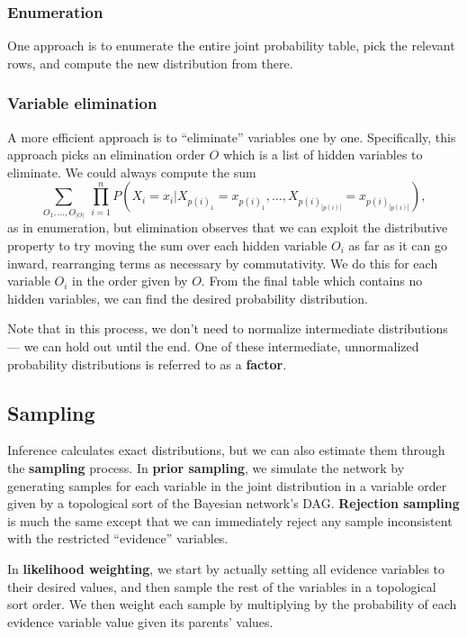 \documentclass[12pt]{article}
\begin{document}
\subsubsection{Enumeration}

One approach is to enumerate the entire joint probability table, pick the relevant rows, and compute the new distribution from there.

\subsubsection{Variable elimination}

A more efficient approach is to ``eliminate'' variables one by one. Specifically, this approach picks an elimination order $O$ which is a list of hidden variables to eliminate. We could always compute the sum
\[ \sum_{O_1, \ldots, O_{|O|}}\ \prod_{i = 1}^n P(X_i = x_i | X_{p(i)_1} = x_{p(i)_1}, \ldots, X_{p(i)_{|p(i)|}} = x_{p(i)_{|p(i)|}}), \]
as in enumeration, but elimination observes that we can exploit the distributive property to try moving the sum over each hidden variable $O_i$ as far as it can go inward, rearranging terms as necessary by commutativity. We do this for each variable $O_i$ in the order given by $O$. From the final table which contains no hidden variables, we can find the desired probability distribution.

Note that in this process, we don't need to normalize intermediate distributions --- we can hold out until the end. One of these intermediate, unnormalized probability distributions is referred to as a \textbf{factor}.

\subsection{Sampling}

Inference calculates exact distributions, but we can also estimate them through the \textbf{sampling} process. In \textbf{prior sampling}, we simulate the network by generating samples for each variable in the joint distribution in a variable order given by a topological sort of the Bayesian network's DAG. \textbf{Rejection sampling} is much the same except that we can immediately reject any sample inconsistent with the restricted ``evidence'' variables.

In \textbf{likelihood weighting}, we start by actually setting all evidence variables to their desired values, and then sample the rest of the variables in a topological sort order. We then weight each sample by multiplying by the probability of each evidence variable value given its parents' values.
\end{document}
